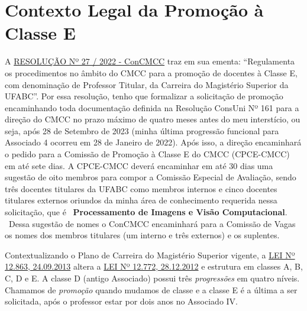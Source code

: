 
\section{Contexto Legal da Promoção à Classe E}

A \href{https://cmcc.ufabc.edu.br/images/resolucao_027.pdf}{RESOLUÇÃO Nº 27 / 2022 - ConCMCC}  traz em sua ementa: ``Regulamenta os procedimentos no âmbito do CMCC para a promoção de docentes à Classe E, com denominação de Professor Titular, da Carreira do Magistério Superior da UFABC''. Por essa resolução, tenho que formalizar a solicitação de promoção encaminhando toda documentação definida na Resolução ConsUni Nº 161 para a direção do CMCC no prazo máximo de quatro meses antes do meu interstício, ou seja, após 28 de Setembro de 2023 (minha última progressão funcional para Associado 4 ocorreu em 28 de Janeiro de 2022). Após isso, a direção encaminhará o pedido para a Comissão de Promoção à Classe E do CMCC (CPCE-CMCC) em até sete dias. A CPCE-CMCC deverá encaminhar em até 30 dias uma sugestão de oito membros para compor a Comissão Especial de Avaliação, sendo três docentes titulares da UFABC como membros internos e cinco docentes titulares externos oriundos da minha área de conhecimento requerida nessa solicitação, que é 
\
\textbf{Processamento de Imagens e Visão Computacional}. 
\
Dessa sugestão de nomes o ConCMCC encaminhará para a Comissão de Vagas os nomes dos membros titulares (um interno e três externos) e os suplentes.

Contextualizando o Plano de Carreira do Magistério Superior vigente, a \href{https://www2.camara.leg.br/legin/fed/lei/2013/lei-12863-24-setembro-2013-777081-publicacaooriginal-141211-pl.html}{LEI Nº 12.863, 24.09.2013} altera a \href{https://www.planalto.gov.br/ccivil_03/_ato2011-2014/2012/lei/l12772.htm}{LEI Nº 12.772, 28.12.2012} e estrutura em classes A, B, C, D e E. A classe D (antigo Associado) possui três \textit{progressões} em quatro níveis. Chamamos de \textit{promoção} quando mudamos de classe e a classe E é a última a ser solicitada, após o professor estar por dois anos no Associado IV.

